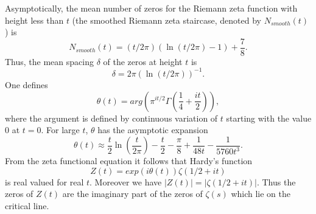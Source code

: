 \documentclass[twoside]{article}
\theoremstyle{definition}
\begin{document}
Asymptotically, the mean number of 
zeros for the Riemann zeta function with height less than $t$ (the smoothed Riemann zeta staircase, denoted by 
$N_{smooth}(t)$) is~\cite{Edwards(1974)}
\begin{equation}  
N_{smooth}(t) = (t/2\pi)(\ln(t/2\pi)-1)+\frac{7}{8}.
\label{eq:Rnumber}
\end{equation}
Thus, the mean spacing $\delta$ of the zeros at height $t$ is 
\begin{equation}  
\delta = 2\pi(\ln (t/2\pi))^{-1}. 
\label{eq:spacing}
\end{equation}
One defines
\begin{equation}
\theta(t) = arg (\pi^{it/2} \Gamma(\frac{1}{4} + \frac{it}{2})), 
\label{eq:theta}
\end{equation}
where the argument is defined by continuous variation of $t$ starting with the value $0$ at $t = 0$.
For large $t$, $\theta$ has the asymptotic expansion
\begin{equation}
\theta(t) \approx \frac{t}{2}\ln (\frac{t}{2\pi}) - \frac{t}{2} - \frac{\pi}{8} + \frac{1}{48t} - \frac{1}{5760t^3}. 
\label{eq:thetaAsymptotic}
\end{equation}
From the zeta functional equation it follows that Hardy's function 
\begin{equation}
Z(t)=exp(i\theta(t))\zeta(1/2 +it) 
\label{eq:hardy}
\end{equation}
is real valued for real $t$. 
Moreover we have $|Z(t)| = |\zeta(1/2+it)|$. Thus the zeros of $Z(t)$ are the imaginary part of the zeros 
of $\zeta(s)$ which lie on the critical line.  
\end{document}
